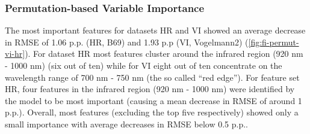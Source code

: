 \documentclass[final]{IEEEtran}
\begin{document}
\subsubsection{Permutation-based Variable Importance}


The most important features for datasets HR and VI showed an average decrease in RMSE of 1.06 p.p. (HR, B69) and 1.93 p.p (VI, Vogelmann2) (\autoref{fig:fi-permut-vi-hr}).
For dataset HR most features cluster around the infrared region (920 nm - 1000 nm) (six out of ten) while for VI eight out of ten concentrate on the wavelength range of 700 nm - 750 nm (the so called \enquote{red edge}).
For feature set HR, four features in the infrared region (920 nm - 1000 nm) were identified by the model to be most important (causing a mean decrease in RMSE of around 1 p.p.).
Overall, most features (excluding the top five respectively) showed only a small importance with average decreases in RMSE below 0.5 p.p..
\end{document}
